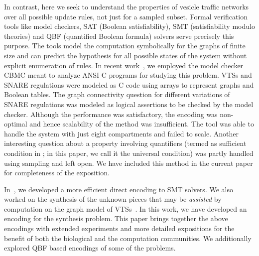 %
%
%
%
%
%
%
%

In contrast, here we seek to understand the properties of vesicle traffic networks
over all possible update rules, not just for a sampled subset.
%
Formal verification tools like model checkers, SAT (Boolean satisfiability), SMT (satisfiability modulo theories) and QBF (quantified Boolean formula) solvers serve precisely this purpose. 
%
The tools model the computation symbolically for the graphs of finite size and can predict the hypothesis for all possible states of the system without explicit enumeration of rules. 
%
In recent work~\cite{shukla2017discovering}, we employed the model checker CBMC \cite{ckl2004} meant to analyze ANSI C programs for studying this problem. 
%
VTSs and SNARE regulations were modeled as C code using arrays to represent graphs and Boolean tables. 
%
The graph connectivity question for different variations of SNARE regulations was modeled as logical assertions to be checked by the model checker. 
%
Although the performance was satisfactory, the encoding was non-optimal and hence scalability of the method was insufficient.
%
The tool was able to handle the system with just eight compartments
and failed to scale.
% 
Another interesting question about a property involving quantifiers (termed as sufficient condition in \cite{shukla2017discovering}; in this paper, we call it the universal condition) was partly handled
using sampling and left open.
%
We have included this method in the current paper for completeness of the
exposition.

%
In~\cite{smtVTS}, we developed a more efficient direct encoding to SMT solvers. 
%
We also worked on the synthesis of the unknown pieces that may
be {\em assisted} by computation on the graph model of VTSs~\cite{synthesisGupta}.
%
In this work, we have developed an encoding for the synthesis problem.
%
This paper brings together the above encodings with extended experiments and more detailed
expositions for the benefit of both the biological and the computation communities.
We additionally explored QBF based encodings of some of the problems.


